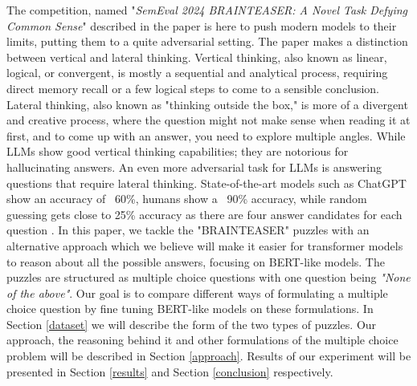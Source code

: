 The competition, named "\textit{SemEval 2024 BRAINTEASER: A Novel Task Defying Common Sense}" described in the paper \citep{semeval} is here to push modern models to their limits, putting
them to a quite adversarial setting.
The paper makes a distinction between vertical and lateral thinking.
Vertical thinking, also known as linear, logical, or convergent, is mostly a sequential and analytical process, requiring direct memory recall or a few logical steps to come to a sensible conclusion.
Lateral thinking, also known as "thinking outside the box," is more of a divergent and creative process, where the question might not make sense when reading it at first, and to come up with an answer, you need to explore multiple angles.
While LLMs show good vertical thinking capabilities; they are notorious for hallucinating answers.
An even more adversarial task for LLMs is answering questions that require lateral thinking. State-of-the-art models such as ChatGPT show an accuracy of ~60\%, humans show a ~90\% accuracy, while random guessing gets close to 25\% accuracy as there are four answer candidates for each question \citep{semeval}.
In this paper, we tackle the "BRAINTEASER" puzzles with an alternative approach which we believe will make it easier for transformer models to reason about all the possible answers, focusing on BERT-like models.
The puzzles are structured as multiple choice questions with one question being \emph{"None of the above"}.
Our goal is to compare different ways of formulating a multiple choice question by fine tuning BERT-like models on these formulations.
In Section \ref{dataset} we will describe the form of the two types of puzzles. 
Our approach, the reasoning behind it and other formulations of the multiple choice problem will be described in Section \ref{approach}.
Results of our experiment will be presented in Section \ref{results} and Section \ref{conclusion} respectively.